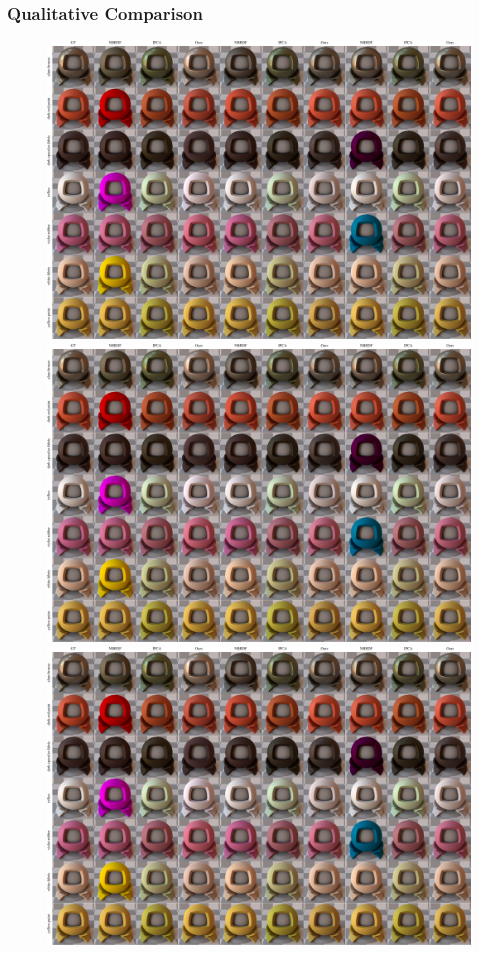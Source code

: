 \subsubsection{Qualitative Comparison}\label{sec:qual_comp}
\begin{figure}[t]
  \centering
{}%
  {\includegraphics[width=0.9\linewidth]{Chapters/hyperbrdf-figs/imp_comp_upt_3vals.pdf}}
%
  {\includegraphics[width=0.9\linewidth]{Chapters/hyperbrdf-figs/imp_comp_upt_3vals.pdf}}
%
  {\includegraphics[width=0.9\linewidth]{Chapters/hyperbrdf-figs/imp_comp_upt_3vals.pdf}}

\end{figure}

